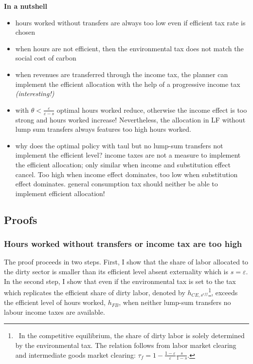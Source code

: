 \textbf{In a nutshell}
\begin{itemize}
	\item hours worked without transfers are always too low even if efficient tax rate is chosen
	\item when hours are not efficient, then the environmental tax does not match the social cost of carbon
	\item when revenues are transferred through the income tax, the planner can implement the efficient allocation with the help of a progressive income tax \textit{(interesting!)}
	\item with $\theta<\frac{\varepsilon}{\varepsilon-s}$ optimal hours worked reduce, otherwise the income effect is too strong and hours worked increase! 
	Nevertheless, the allocation in LF without lump sum transfers always features too high hours worked. 
	\item why does the optimal policy with taul but no lump-sum transfers not implement the efficient level? \ar income taxes are not a measure to implement the efficient allocation; only similar when income and substitution effect cancel. Too high when income effect dominates, too low when substitution effect dominates.
 \ar general consumption tax should neither be able to implement efficient allocation! 
\end{itemize}

\subsection{Proofs}
\subsubsection{Hours worked without transfers or income tax are too high}

The proof proceeds in two steps. First, I show that the share of labor allocated to the dirty sector is smaller than its efficient level absent externality which is $s=\varepsilon$.
	In the second step, I show that even if the environmental tax is set to the tax which replicates the efficient share of dirty labor, denoted by $h_{CE, s^{eff}}$\footnote{\ In the competitive equilibrium, the share of dirty labor is solely determined by the environmental tax. The relation follows from labor market clearing and intermediate goods market clearing: $\tau_f=1-\frac{1-\varepsilon}{\varepsilon}\frac{s}{1-s}$.}, exceeds the efficient level of hours worked, $h_{FB}$, when neither lump-sum transfers no labour income taxes are available.
	
